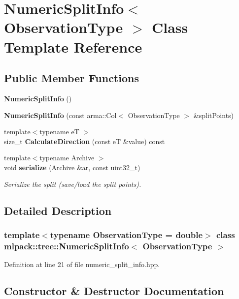 \section{Numeric\+Split\+Info$<$ Observation\+Type $>$ Class Template Reference}
\label{classmlpack_1_1tree_1_1NumericSplitInfo}
\subsection*{Public Member Functions}
\begin{DoxyCompactItemize}
\item 
\textbf{ Numeric\+Split\+Info} ()
\item 
\textbf{ Numeric\+Split\+Info} (const arma\+::\+Col$<$ Observation\+Type $>$ \&split\+Points)
\item 
{\footnotesize template$<$typename eT $>$ }\\size\+\_\+t \textbf{ Calculate\+Direction} (const eT \&value) const
\item 
{\footnotesize template$<$typename Archive $>$ }\\void \textbf{ serialize} (Archive \&ar, const uint32\+\_\+t)
\begin{DoxyCompactList}\small\item\em Serialize the split (save/load the split points). \end{DoxyCompactList}\end{DoxyCompactItemize}


\subsection{Detailed Description}
\subsubsection*{template$<$typename Observation\+Type = double$>$\newline
class mlpack\+::tree\+::\+Numeric\+Split\+Info$<$ Observation\+Type $>$}



Definition at line 21 of file numeric\+\_\+split\+\_\+info.\+hpp.



\subsection{Constructor \& Destructor Documentation}
\mbox{\label{classmlpack_1_1tree_1_1NumericSplitInfo_a892617978e7e3c7202df113e230f7c7e}} 
